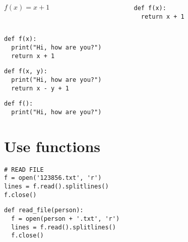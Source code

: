 \documentclass[aspectratio=169]{beamer}
\newcommand{\style}[1]{\ttfamily#1}
\begin{document}
\begin{frame}[fragile]
\begin{columns}
\begin{column}{0.5\textwidth}
\LARGE
$f(x) = x + 1$
\end{column}
\begin{column}{0.5\textwidth}
\begin{lstlisting}[basicstyle=\style{\LARGE}]
def f(x):
  return x + 1
\end{lstlisting}
\end{column}
\end{columns}
\end{frame}

\begin{frame}[fragile]
\begin{lstlisting}[basicstyle=\style{\large}]
def f(x):
  print("Hi, how are you?")
  return x + 1
\end{lstlisting}
\end{frame}

\begin{frame}[fragile]
\begin{lstlisting}[basicstyle=\style{\large}]
def f(x, y):
  print("Hi, how are you?")
  return x - y + 1
\end{lstlisting}
\end{frame}

\begin{frame}[fragile]
\begin{lstlisting}[basicstyle=\style{\large}]
def f():
  print("Hi, how are you?")
\end{lstlisting}
\end{frame}

\section{Use functions}

\begin{frame}[fragile]
\begin{lstlisting}[basicstyle=\style{\small}]
# READ FILE
f = open('123856.txt', 'r')
lines = f.read().splitlines()
f.close()
\end{lstlisting}
\vspace{1.5cm}
\begin{lstlisting}[basicstyle=\style{\small}]
def read_file(person):
  f = open(person + '.txt', 'r')
  lines = f.read().splitlines()
  f.close()
\end{lstlisting}
\end{frame}
\end{document}
